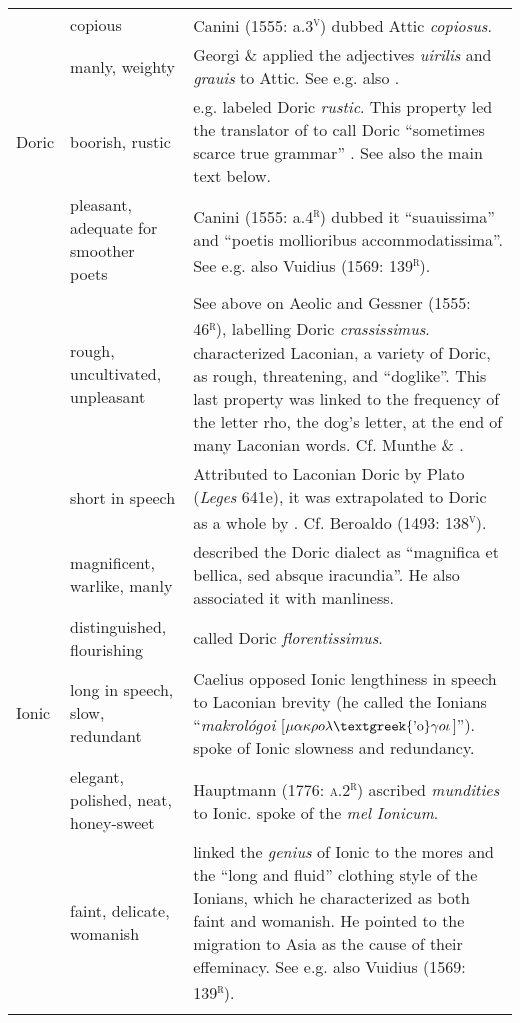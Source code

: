 \begin{tabularx}{\textwidth}{XXX}
& copious & Canini (1555: a.3\textsc{\textsuperscript{v}}) dubbed Attic \textit{copiosus}.\\
\hhline{~--} & manly, weighty & Georgi \& \citet[6]{Graun1729} applied the adjectives \textit{uirilis} and \textit{grauis} to Attic. See e.g. also \citet[515]{Fabricius1711}.\\
\multicolumn{1}{X}{Doric} & boorish, rustic & \citet[317]{Bentley1699} e.g. labeled Doric \textit{rustic}. This property led the translator of \citet[117]{Rapin1659} to call Doric “sometimes scarce true grammar” \citep[31]{Rapin1684}. See also the main text below.\\
& pleasant, adequate for smoother poets & Canini (1555: a.4\textsc{\textsuperscript{r}}) dubbed it “suauissima” and “poetis mollioribus accommodatissima”. See e.g. also Vuidius (1569: 139\textsc{\textsuperscript{r}}).\\
\hhline{~--} & rough, uncultivated, unpleasant & See above on Aeolic and Gessner (1555: 46\textsc{\textsuperscript{r}}), labelling Doric \textit{crassissimus}. \citet[54]{Vossius1673} characterized Laconian, a variety of Doric, as rough, threatening, and “doglike”. This last property was linked to the frequency of the letter rho, the dog’s letter, at the end of many Laconian words. Cf. Munthe \& \citet[24]{Heiberg1748}.\\
\hhline{~--} & short in speech & Attributed to Laconian Doric by Plato (\textit{Leges} 641e), it was extrapolated to Doric as a whole by \citet[393]{Saumaise1643a}. Cf. Beroaldo (1493: 138\textsc{\textsuperscript{v}}).\\
\hhline{~--} & magnificent, warlike, manly & \citet[55]{Vossius1673} described the Doric dialect as “magnifica et bellica, sed absque iracundia”. He also associated it with manliness.\\
\hhline{~--} & distinguished, flourishing & \citet[161]{Gesner1774} called Doric \textit{florentissimus}.\\
\multicolumn{1}{X}{Ionic} & long in speech, slow, redundant & Caelius \citet[677]{Rhodiginus1542} opposed Ionic lengthiness in speech to Laconian brevity (he called the Ionians “\textit{makrológoi} [$\mu \alpha \kappa \rho o\lambda \text{\textgreek{'o}}\gamma o\iota $]”). \citet[75]{Saumaise1643a} spoke of Ionic slowness and redundancy.\\
& elegant, polished, neat, honey-sweet & Hauptmann (1776: \textsc{a.2}\textsc{\textsuperscript{r}}) ascribed \textit{mundities} to Ionic. \citet[290]{Verwey1684} spoke of the \textit{mel} \textit{Ionicum}.\\
\hhline{~--} & faint, delicate, womanish & \citet[75]{Saumaise1643a} linked the \textit{genius} of Ionic to the mores and the “long and fluid” clothing style of the Ionians, which he characterized as both faint and womanish. He pointed to the migration to Asia as the cause of their effeminacy. See e.g. also Vuidius (1569: 139\textsc{\textsuperscript{r}}).\\
\hhline{~--}
\lspbottomrule
\end{tabularx}
